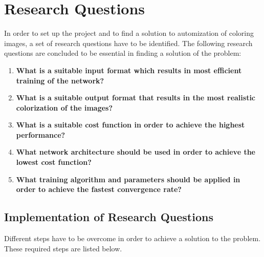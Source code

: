 \section{Research Questions}

In order to set up the project and to find a solution to automization of coloring images, a set of research questions have to be identified. The following research questions are concluded to be essential in finding a solution of the problem:

\begin{enumerate}
	\item \textbf{What is a suitable input format which results in most efficient training of the network?}
	\item \textbf{What is a suitable output format that results in the most realistic colorization of the images?}
	\item \textbf{What is a suitable cost function in order to achieve the highest performance?}
	\item \textbf{What network architecture should be used in order to achieve the lowest cost function?}
	\item \textbf{What training algorithm and parameters should be applied in order to achieve the fastest convergence rate?}
\end{enumerate}

\subsection{Implementation of Research Questions}
	
Different steps have to be overcome in order to achieve a solution to the problem. These required steps are listed below.

